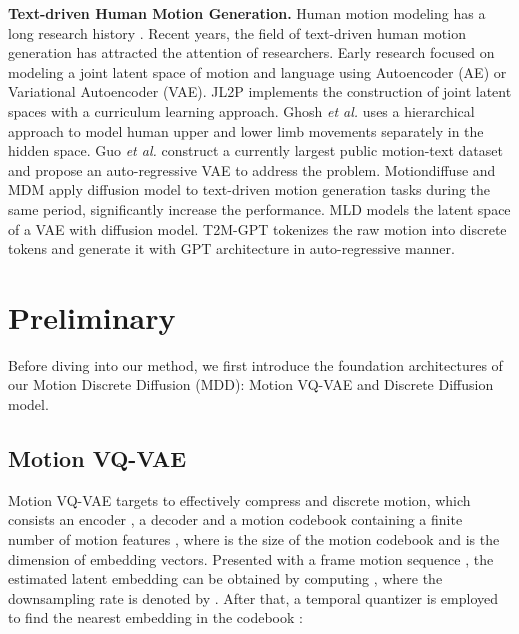 \documentclass[letterpaper]{article} \usepackage{aaai24}
\begin{document}
\noindent\textbf{Text-driven Human Motion Generation.} Human motion modeling has a long research history \cite{10.1093/oso/9780195073591.001.0001}. 
Recent years, the field of text-driven human motion generation has attracted the attention of researchers.
Early research focused on modeling a joint latent space of motion and language using Autoencoder (AE) or Variational Autoencoder (VAE). 
JL2P \cite{ahuja2019language2pose} implements the construction of joint latent spaces with a curriculum learning approach. 
Ghosh \textit{et al.} \cite{ghosh2023synthesis} uses a hierarchical approach to model human upper and lower limb movements separately in the hidden space. 
Guo \textit{et al.} \cite{guo2022generating} construct a currently largest public motion-text dataset and propose an auto-regressive VAE to address the problem. 
Motiondiffuse \cite{zhang2022motiondiffuse} and MDM \cite{tevet2022human} apply diffusion model to text-driven motion generation tasks during the same period, significantly increase the performance. MLD \cite{chen2023executing} models the latent space of a VAE with diffusion model. T2M-GPT \cite{zhang2023t2mgpt} tokenizes the raw motion into discrete tokens and generate it with GPT architecture in auto-regressive manner.








\section{Preliminary}Before diving into our method, we first introduce the foundation architectures of our Motion Discrete Diffusion (MDD): Motion VQ-VAE and Discrete Diffusion model.

\subsection{Motion VQ-VAE}


Motion VQ-VAE \cite{oord2018neural,razavi2019generating, zhang2023t2mgpt} targets to effectively compress and discrete motion, 
which consists an encoder , a decoder  and a motion codebook  containing a finite number of motion features
, where  is the size of the motion codebook and  is the dimension of embedding vectors.
Presented with a  frame motion sequence , the estimated latent embedding can be obtained by computing , where the downsampling rate 
 is denoted by . After that, {a temporal quantizer}  is employed to find the nearest embedding  in the codebook :
\end{document}
